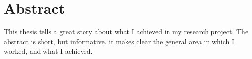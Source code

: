 \chapter*{Abstract}  %

This thesis tells a great story about what I achieved in my research project. The abstract is short, but informative. it makes clear the general area in which I worked, and what I achieved.

